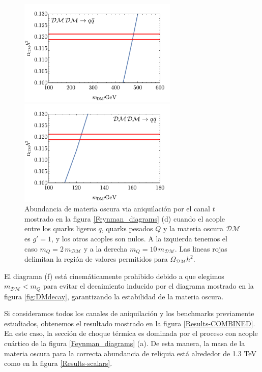 \begin{figure}[h!]
\centering
\begin{minipage}{.5\textwidth}
  \centering
  \includegraphics[height=2in]{Results/quarks-1.pdf}
\end{minipage}%
\centering
\begin{minipage}{.5\textwidth}
  \centering
  \includegraphics[height=2in]{Results/quarks-2.pdf}
\end{minipage}%
\caption[\hspace{0.15in}Abundancia de materia oscura 3]{Abundancia de materia oscura via aniquilación por el canal $t$ mostrado en la figura \ref{Feynman_diagrams} (d) cuando el acople entre los quarks ligeros $q$, quarks pesados $Q$ y la materia oscura $\mathcal{DM}$ es $g'=1$, y los otros acoples son nulos. A la izquierda tenemos el caso $m_Q =2\, m_\mathcal{DM}$ y a la derecha $m_Q =10\, m_\mathcal{DM}$. Las lineas rojas delimitan la región de valores permitidos para $\Omega_{\mathcal{DM}}h^2$.} 
\label{Results-quarks}
\end{figure}


El diagrama (f) está cinemáticamente prohibido debido a que elegimos $m_\mathcal{DM}<m_Q$ para evitar el decaimiento inducido por el diagrama mostrado en la figura \ref{fig:DMdecay}, garantizando la estabilidad de la materia oscura. 

Si consideramos todos los canales de aniquilación y los benchmarks previamente estudiados, obtenemos el resultado mostrado en la figura \ref{Results-COMBINED}. En este caso, la sección de choque térmica es dominada por el proceso con acople cuártico de la figura \ref{Feynman_diagrams} (a). De esta manera, la masa de la materia oscura para la correcta abundancia de reliquia está alrededor de 1.3 TeV como en la figura \ref{Results-scalars}.


